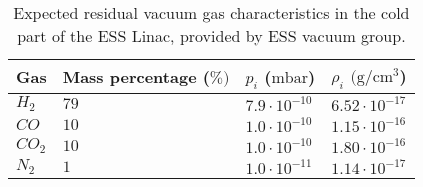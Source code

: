 \begin{table}[ht]
	\centering
	\caption[Expected residual vacuum gas characteristics in the cold part of the ESS Linac, provided by ESS vacuum group]
	{Expected residual vacuum gas characteristics in the cold part of the ESS Linac, provided by ESS vacuum group.}
	\label{chap3:ess_vacuum_gas}
	\begin{tabular}{llll}
		\toprule
		Gas        & Mass percentage (\(\%)\) & $p_{i}$ (\(\mathrm{mbar}\)) & $\rho_{i}$ $(\mathrm{g/cm^{3}}$) \\
		\midrule
		\(H_{2}\)  & \(79\)                   & \(7.9\cdot10^{-10}\)        & \(6.52\cdot
		10^{-17}\)                                                                                             \\
		\(CO\)     & \(10\)                   & \(1.0\cdot10^{-10}\)        & \(1.15\cdot
		10^{-16}\)                                                                                             \\
		\(CO_{2}\) & \(10\)                   & \(1.0\cdot10^{-10}\)        & \(1.80\cdot
		10^{-16}\)                                                                                             \\
		\(N_{2}\)  & \(1\)                    & \(1.0\cdot10^{-11}\)        & \(1.14\cdot
		10^{-17}\)                                                                                             \\
		\bottomrule
	\end{tabular}
\end{table}